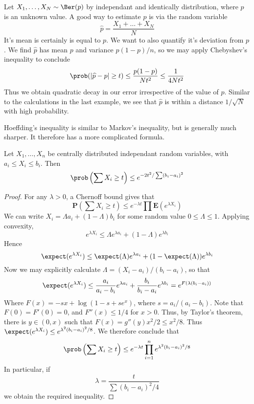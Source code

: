 \begin{example}
    Let $X_1, \dots, X_N \sim \Ber(p)$ by independant and identically distribution, where $p$ is an unknown value. A good way to estimate $p$ is via the random variable
    \[ \widehat{p} = \frac{X_1 + \dots + X_N}{N} \]
    It's mean is certainly is equal to $p$. We want to also quantify it's deviation from $p$. We find $\widehat{p}$ has mean $p$ and variance $p(1-p)/n$, so we may apply Chebyshev's inequality to conclude
    \[ \prob(|\widehat{p} - p| \geq t) \leq \frac{p(1-p)}{Nt^2} \leq \frac{1}{4Nt^2} \]
    Thus we obtain quadratic decay in our error irrespective of the value of $p$. Similar to the calculations in the last example, we see that $\widehat{p}$ is within a distance $1/\sqrt{N}$ with high probability.
\end{example}

Hoeffding's inequality is similar to Markov's inequality, but is generally much sharper. It therefore has a more complicated formula.

\begin{theorem}
    Let $X_1, \dots, X_n$ be centrally distributed independant random variables, with $a_i \leq X_i \leq b_i$. Then
    \[ \prob \left( \sum X_i \geq t \right) \leq e^{-2t^2/\sum (b_i - a_i)^2} \]
\end{theorem}
\begin{proof}
    For any $\lambda > 0$, a Chernoff bound gives that
    \[ \mathbf{P} \left( \sum X_i \geq t \right) \leq e^{- \lambda t} \prod \mathbf{E}(e^{\lambda X_i}) \]
    We can write $X_i = \Lambda a_i + (1 - \Lambda) b_i$ for some random value $0 \leq \Lambda \leq 1$. Applying convexity,
    \[ e^{\lambda X_i} \leq \Lambda e^{\lambda a_i} + (1 - \Lambda) e^{\lambda b_i} \]
    Hence
    \[ \expect(e^{\lambda X_i}) \leq \expect(\Lambda) e^{\lambda a_i} + (1 - \expect(\Lambda)) e^{\lambda b_i} \]
    Now we may explicitly calculate $\Lambda = (X_i - a_i)/(b_i - a_i)$, so that
    \[ \expect(e^{\lambda X_i}) \leq \frac{a_i}{a_i - b_i} e^{\lambda a_i} + \frac{b_i}{b_i - a_i} e^{\lambda b_i} = e^{F(\lambda (b_i - a_i))} \]
    Where $F(x) = - s x + \log(1 - s + s e^x)$, where $s = a_i/(a_i - b_i)$. Note that $F(0) = F'(0) = 0$, and $F''(x) \leq 1/4$ for $x > 0$. Thus, by Taylor's theorem, there is $y \in (0,x)$ such that $F(x) = g''(y) x^2/2 \leq x^2/8$. Thus $\expect(e^{\lambda X_i}) \leq e^{\lambda^2(b_i - a_i)^2/8}$. We therefore conclude that
    \[ \prob \left( \sum X_i \geq t \right) \leq e^{-\lambda t} \prod_{i = 1}^n e^{\lambda^2 (b_i - a_i)^2/8} \]
    In particular, if
    \[ \lambda = \frac{t}{\sum (b_i - a_i)^2/4} \]
    we obtain the required inequality.
\end{proof}

